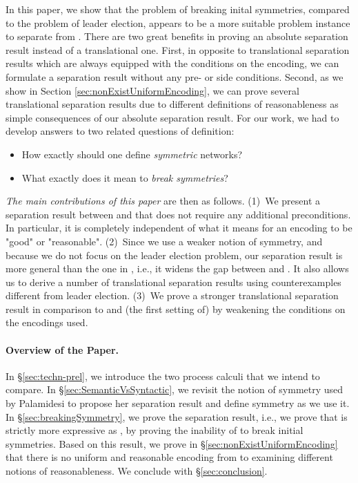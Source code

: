 \documentclass[11pt,techReport]{eptcs}
\begin{document}
In this paper, we show that the problem of breaking inital symmetries, compared to the problem of leader election, appears to be a more suitable problem instance to separate \pimix from \pisep. There are two great benefits in proving an absolute separation result instead of a translational one. First, in opposite to translational separation results which are always equipped with the conditions on the encoding, we can formulate a separation result without any pre- or side conditions.  Second, as we show in Section \ref{sec:nonExistUniformEncoding}, we can prove several translational separation results due to different definitions of reasonableness as simple consequences of our absolute separation result.
For our work, we had to develop answers to two related questions of definition:
\begin{itemize}
\item How exactly should one define \emph{symmetric} networks?
\item What exactly does it mean to \emph{break symmetries}?
\end{itemize}
\emph{The main contributions of this paper} are then as follows.
(1)~We present a separation result between \pimix and \pisep that does not require any additional preconditions.  In particular, it is completely independent of what it means for an encoding to be "good" or "reasonable". 
(2)~Since we use a weaker notion of symmetry, and because we do not focus on the leader election problem, our separation result is more general than the one in \cite{palamidessi03}, i.e., it widens the gap between \pimix and \pisep.  It also allows us to derive a number of translational separation results using counterexamples different from leader election.
(3)~We prove a stronger translational separation result in comparison to \cite{palamidessi03, vigliottiPhillipsPalamidessi07} and (the first setting of) \cite{gorla08d} by weakening the conditions on the encodings used.


\paragraph{Overview of the Paper.}

In \S\ref{sec:techn-prel}, we introduce the two process calculi that we intend to compare. In \S\ref{sec:SemanticVsSyntactic}, we revisit the notion of symmetry used by Palamidesi to propose her separation result and define symmetry as we  use it. In \S\ref{sec:breakingSymmetry}, we prove the separation result, i.e., we prove that \pimix is strictly more expressive as \pisep, by proving the inability of \pisep to break initial symmetries. Based on this result, we prove in \S\ref{sec:nonExistUniformEncoding} that there is no uniform and reasonable encoding from \pimix to \pisep examining different notions of reasonableness. We conclude with \S\ref{sec:conclusion}.
\end{document}
